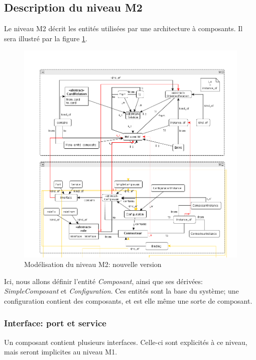 \documentclass[french,a4paper,titlepage]{article}
\begin{document}
				
		\subsection{Description du niveau M2}
		
			Le niveau M2 décrit les entités utilisées par une architecture à
			composants. Il sera illustré par la figure \ref{fig:m2-new}.
			
			\begin{figure}[htb]
				\centering
				\includegraphics[width=\textwidth]{m2-new.png}
				\caption{Modélisation du niveau M2: nouvelle version}
				\label{fig:m2-new}
			\end{figure}
		
		
		Ici, nous allons définir l'entité \emph{Composant}, ainsi que ses dérivées:
		\emph{SimpleComposant} et \emph{Configuration}. Ces entités sont la base du
		système; une configuration contient des composants, et est elle même une
		sorte de composant.
		
		
		\subsubsection{Interface: port et service}
		
			Un composant contient plusieurs interfaces. Celle-ci sont explicités à ce
			niveau, mais seront implicites au niveau M1.
			
\end{document}
